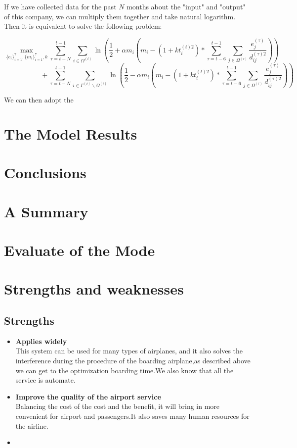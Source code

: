 \documentclass[tcn = 37075, sheet = true, abstract = true]{mcmthesis}
\begin{document}
If we have collected data for the past $N$ months about the "input" and "output" of this company, we can multiply them together and take natural logarithm. Then it is equivalent to solve the following problem:

$$\max \limits_{\{e_i\}_{i=1}^7,\{m_i\}_{i=1}^7,k} \sum\limits_{\tau=t-N}^{t-1} \sum_{i \in \Omega^{(t)}} \ln (\frac{1}{2}+\alpha m_i(m_i-(1+kt_i^{(t)2})*\sum_{\tau=t-6}^{t-1}\sum_{j\in \Omega^{(\tau)}}\frac{e_j^{(\tau)}}{d_{ij}^{(\tau)2}}) ) $$ 
$$~~~~~~~~~~~~~~~~~~~~~~~~+\sum\limits_{\tau=t-N}^{t-1} \sum\limits_{i \in \Gamma^{(t)} \backslash \Omega^{(t)}} \ln (\frac{1}{2}-\alpha m_i(m_i-(1+kt_i^{(t)2})*\sum_{\tau=t-6}^{t-1}\sum_{j\in \Omega^{(\tau)}}\frac{e_j^{(\tau)}}{d_{ij}^{(\tau)2}}) ) $$

We can then adopt the 


\section{The Model Results}
\lipsum[6]

\section{}
\lipsum[9]

\section{Conclusions}
\lipsum[6]

\section{A Summary}
\lipsum[6]

\section{Evaluate of the Mode}

\section{Strengths and weaknesses}
\lipsum[12]

\subsection{Strengths}
\begin{itemize}
\item \textbf{Applies widely}\\
This  system can be used for many types of airplanes, and it also
solves the interference during  the procedure of the boarding
airplane,as described above we can get to the  optimization
boarding time.We also know that all the service is automate.
\item \textbf{Improve the quality of the airport service}\\
Balancing the cost of the cost and the benefit, it will bring in
more convenient  for airport and passengers.It also saves many
human resources for the airline. \item \textbf{}
\end{itemize}
\end{document}
